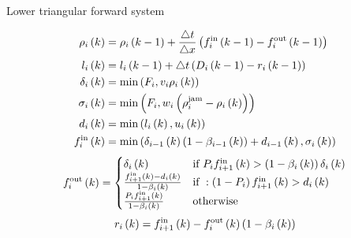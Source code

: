 \documentclass[xcolor=svgnames, english, smaller]{beamer}
\theoremstyle{plain}
\theoremstyle{definition}
\theoremstyle{plain}
\theoremstyle{plain}
\begin{document}
\begin{frame}{Lower triangular forward system}
\begin{minipage}[t]{0.40\linewidth}
\end{minipage}\hfill
\begin{minipage}[t]{0.56\linewidth}
\begin{align}
&& \rho_{i}\left(k\right) & =\rho_{i}\left(k-1\right)+\frac{\triangle t}{\triangle x}\left(f_{i}^{\text{in}}\left(k-1\right)-f_{i}^{\text{out}}\left(k-1\right)\right) &  \nonumber \\
&& l_{i}\left(k\right) & =l_{i}\left(k-1\right)+\triangle t\left(D_{i}\left(k-1\right)-r_{i}\left(k-1\right)\right) &  \nonumber \\
&& \delta_{i}\left(k\right) & =\min\left(F_{i},v_{i}\rho_{i}\left(k\right)\right) &  \nonumber \\
&& \sigma_{i}\left(k\right) & =\min\left(F_{i},w_{i}\left(\rho^{\text{jam}}_{i}-\rho_{i}\left(k\right)\right)\right) & \nonumber \\
&& d_{i}\left(k\right) & =\min\left(l_{i}\left(k\right),u_{i}\left(k\right)\right) &  \nonumber \\
&& f_{i}^{\text{in}}\left(k\right) & =\min\left(\delta_{i-1}\left(k\right)\left(1-\beta_{i-1}\left(k\right)\right)+d_{i-1}\left(k\right),\sigma_{i}\left(k\right)\right) & \nonumber
\end{align}
\begin{multline}
f_{i}^{\text{out}}\left(k\right)
=\begin{cases}
\delta_{i}\left(k\right) 
& \text{if } P_{i}f_{i+1}^{\text{in}}\left(k\right) > \left(1-\beta_{i}\left(k\right)\right)\delta_{i}\left(k\right)
\\
\frac{f_{i+1}^{\text{in}}\left(k\right)-d_{i}\left(k\right)}{1-\beta_{i}\left(k\right)}
& \text{if } : \left(1-P_{i}\right)f_{i+1}^{\text{in}}\left(k\right) > d_{i}\left(k\right)
\\
\frac{P_{i}f_{i+1}^{\text{in}}\left(k\right)}{1-\beta_{i}\left(k\right)} & \text{otherwise } 
\end{cases} \nonumber
\end{multline}
\begin{align}
&& r_{i}\left(k\right) & = f_{i+1}^{\text{in}}\left(k\right) - f_{i}^{\text{out}}\left(k\right)\left(1-\beta_{i}\left(k\right)\right)& \nonumber
\end{align}

\end{minipage}

\end{frame}
\end{document}

